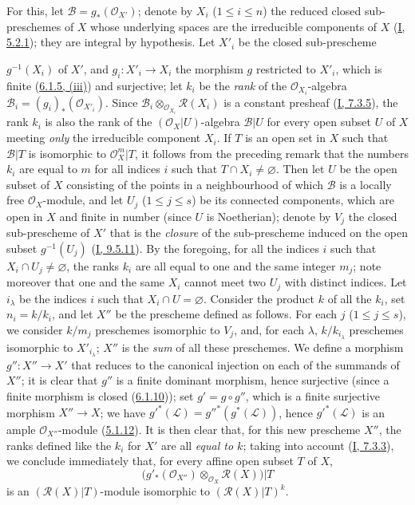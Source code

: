 For this, let $\mathcal{B}=g_*(\mathcal{O}_{X'})$; denote by $X_i$
($1\leq i\leq n$) the reduced closed sub-preschemes of $X$ whose
underlying spaces are the irreducible components of $X$
(\hyperref[I.5.2.1]{I, 5.2.1}); they are integral by hypothesis. Let
$X'_i$ be the closed sub-prescheme


$g^{-1}(X_i)$ of $X'$, and $g_i:X'_i\to X_i$ the morphism $g$ restricted to
$X'_i$, which is finite (\hyperref[II.6.1.5]{6.1.5, (iii)}) and surjective;
let $k_i$ be the \emph{rank} of the $\mathcal{O}_{X_i}$-algebra
$\mathcal{B}_i=(g_i)_*(\mathcal{O}_{X'_i})$. Since
$\mathcal{B}_i\otimes_{\mathcal{O}_{X_i}}\mathcal{R}(X_i)$ is a
constant presheaf (\hyperref[I.7.3.5]{I, 7.3.5}), the rank $k_i$ is
also the rank of the $(\mathcal{O}_X|U)$-algebra $\mathcal{B}|U$ for every
open subset $U$ of $X$ meeting \emph{only} the irreducible component
$X_i$. If $T$ is an open set in $X$ such that $\mathcal{B}|T$ is
isomorphic to $\mathcal{O}_X^m|T$, it follows from the preceding remark that
the numbers $k_i$ are equal to $m$ for all indices $i$ such that
$T\cap X_i\neq\varnothing$. Then let $U$ be the open subset of $X$ consisting of
the points in a neighbourhood of which $\mathcal{B}$ is a locally free
$\mathcal{O}_X$-module, and let $U_j$ ($1\leq j\leq s$) be its connected
components, which are open in $X$ and finite in number (since $U$ is
Noetherian); denote by $V_j$ the closed sub-prescheme of $X'$ that is the
\emph{closure} of the sub-prescheme induced on the open subset $g^{-1}(U_j)$
(\hyperref[I.9.5.11]{I, 9.5.11}). By the foregoing, for all the
indices $i$ such that $X_i\cap U_j\neq\varnothing$, the ranks $k_i$ are all
equal to one and the same integer $m_j$; note moreover that one and the same
$X_i$ cannot meet two $U_j$ with distinct indices. Let $i_\lambda$ be the
indices $i$ such that $X_i\cap U=\varnothing$. Consider the product $k$ of all the
$k_i$, set $n_i=k/k_i$, and let $X''$ be the prescheme defined as follows.
For each $j$ ($1\leq j\leq s$), we consider $k/m_j$ preschemes
isomorphic to $V_j$, and, for each $\lambda$, $k/k_{i_\lambda}$ preschemes
isomorphic to $X'_{i_\lambda}$; $X''$ is the \emph{sum} of all these
preschemes. We define a morphism $g'':X''\to X'$ that reduces to the
canonical injection on each of the summands of $X''$; it is clear that
$g''$ is a finite dominant morphism, hence surjective (since a finite
morphism is closed (\hyperref[II.6.1.10]{6.1.10})); set
$g'=g\circ g''$, which is a finite surjective morphism $X''\to X$; we have
${g'}^*(\mathcal{L})={g''}^*(g^*(\mathcal{L}))$, hence
${g'}^*(\mathcal{L})$ is an ample $\mathcal{O}_{X''}$-module
(\hyperref[II.5.1.12]{5.1.12}). It is then clear that, for this new
prescheme $X''$, the ranks defined like the $k_i$ for $X'$ are all
\emph{equal to $k$}; taking into account
(\hyperref[I.7.3.3]{I, 7.3.3}), we conclude immediately that, for every
affine open subset $T$ of $X$,
\[
\bigl(g'_*(\mathcal{O}_{X''})
\otimes_{\mathcal{O}_X}\mathcal{R}(X)\bigr)|T
\]
is an $(\mathcal{R}(X)|T)$-module isomorphic to
$(\mathcal{R}(X)|T)^k$.

